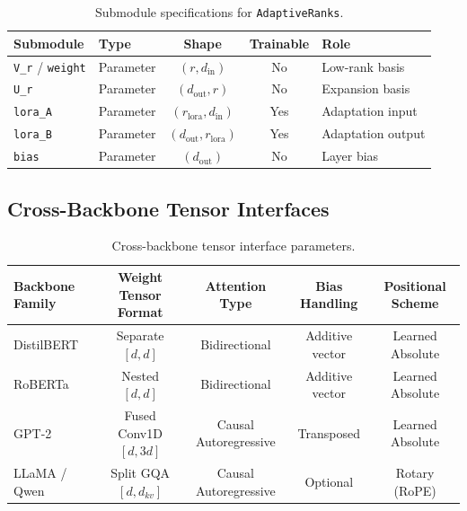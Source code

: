 \begin{table}[H]
\centering
\small
\begin{tabular}{llccp{5cm}}
\toprule
\textbf{Submodule} & \textbf{Type} & \textbf{Shape} & \textbf{Trainable} & \textbf{Role} \\
\midrule
\texttt{V\_r} / \texttt{weight} & Parameter & $(r, d_{\text{in}})$ & No & Low-rank basis \\
\texttt{U\_r} & Parameter & $(d_{\text{out}}, r)$ & No & Expansion basis \\
\texttt{lora\_A} & Parameter & $(r_{\text{lora}}, d_{\text{in}})$ & Yes & Adaptation input \\
\texttt{lora\_B} & Parameter & $(d_{\text{out}}, r_{\text{lora}})$ & Yes & Adaptation output \\
\texttt{bias} & Parameter & $(d_{\text{out}})$ & No & Layer bias \\
\bottomrule
\end{tabular}
\caption{Submodule specifications for \texttt{AdaptiveRanks}.}
\label{tab:submodules_adaptivecompressor}
\end{table}

\subsection{Cross-Backbone Tensor Interfaces}
\begin{table}[H]
\centering
\small
\begin{tabular}{lcccc}
\toprule
\textbf{Backbone Family} & \textbf{Weight Tensor Format} & \textbf{Attention Type} & \textbf{Bias Handling} & \textbf{Positional Scheme} \\
\midrule
DistilBERT & Separate $[d, d]$ & Bidirectional & Additive vector & Learned Absolute \\
RoBERTa & Nested $[d, d]$ & Bidirectional & Additive vector & Learned Absolute \\
GPT-2 & Fused Conv1D $[d, 3d]$ & Causal Autoregressive & Transposed & Learned Absolute \\
LLaMA / Qwen & Split GQA $[d, d_{kv}]$ & Causal Autoregressive & Optional & Rotary (RoPE) \\
\bottomrule
\end{tabular}
\caption{Cross-backbone tensor interface parameters.}
\label{tab:backbone_interfaces}
\end{table}

